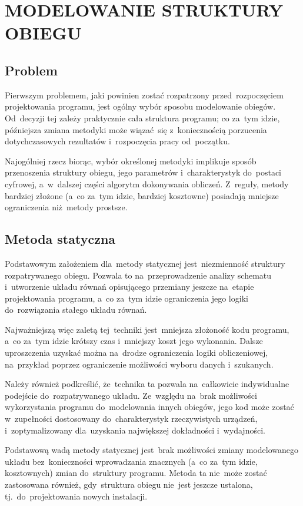 \section{MODELOWANIE STRUKTURY OBIEGU}

\subsection{Problem}

Pierwszym problemem, jaki powinien zostać rozpatrzony przed~rozpoczęciem
projektowania programu, jest ogólny wybór sposobu modelowanie obiegów.
Od~decyzji tej zależy praktycznie cała struktura programu; co za~tym
idzie, późniejsza zmiana metodyki może wiązać~się z~koniecznością
porzucenia dotychczasowych rezultatów i~rozpoczęcia pracy od~początku.

Najogólniej rzecz biorąc, wybór określonej metodyki implikuje sposób
przenoszenia struktury obiegu, jego parametrów i~charakterystyk
do~postaci cyfrowej, a~w~dalszej części algorytm dokonywania obliczeń.
Z~reguły, metody bardziej złożone (a~co za~tym idzie, bardziej
kosztowne) posiadają mniejsze ograniczenia niż~metody prostsze.


\subsection{Metoda statyczna}

Podstawowym założeniem dla~metody statycznej jest~niezmienność struktury
rozpatrywanego obiegu. Pozwala to na~przeprowadzenie analizy schematu
i~utworzenie układu równań opisującego przemiany jeszcze na~etapie
projektowania programu, a~co za~tym idzie ograniczenia jego logiki
do~rozwiązania stałego układu równań.

Najważniejszą więc zaletą tej~techniki jest~mniejsza złożoność kodu
programu, a~co za~tym idzie krótszy czas i~mniejszy koszt jego
wykonania. Dalsze uproszczenia uzyskać można na~drodze ograniczenia
logiki obliczeniowej, na~przykład poprzez ograniczenie możliwości wyboru
danych i~szukanych.

Należy również podkreślić, że~technika ta pozwala na~całkowicie
indywidualne podejście do~rozpatrywanego układu. Ze~względu na~brak
możliwości wykorzystania programu do~modelowania innych obiegów, jego
kod może zostać w~zupełności dostosowany do~charakterystyk rzeczywistych
urządzeń, i~zoptymalizowany dla~uzyskania największej dokładności
i~wydajności.

Podstawową wadą metody statycznej jest~brak możliwości zmiany
modelowanego układu bez~konieczności wprowadzania znacznych (a~co za~tym
idzie, kosztownych) zmian do~struktury programu. Metoda ta
nie~może zostać zastosowana również, gdy~struktura obiegu nie~jest
jeszcze ustalona, tj.~do~projektowania nowych instalacji.

